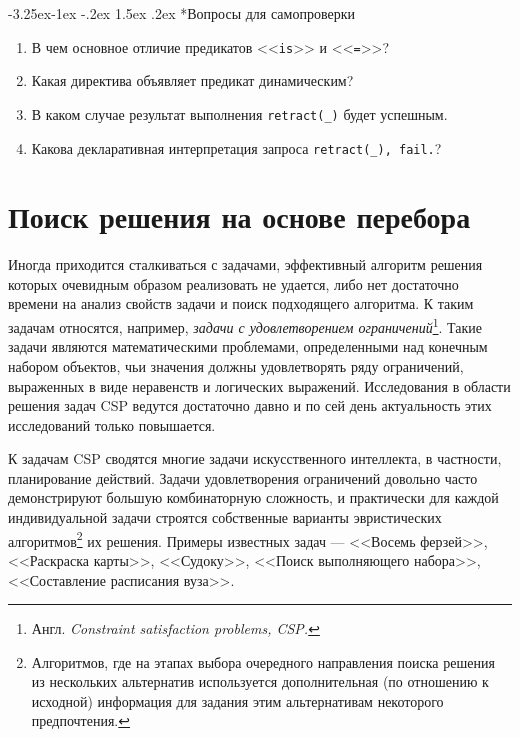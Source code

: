 \documentclass[12pt, openany, twoside]{book} %
\makeatletter
\renewcommand\subsubsection{\@startsection{subsubsection}{3}{\z@}%
                                     {-3.25ex\@plus -1ex \@minus -.2ex}%
                                     {1.5ex \@plus .2ex}%
                                     {\normalfont\normalsize\bfseries}}
\newenvironment{questions}{\subsubsection*{Вопросы для самопроверки}\begin{enumerate}}{\end{enumerate}}
\makeatother
\begin{document}
\begin{questions}
  \item{} В чем основное отличие предикатов <<\texttt{is}>> и <<\texttt{=}>>?
  \item{} Какая директива объявляет предикат динамическим?
  \item{} В каком случае результат выполнения \texttt{retract(\_)} будет ус\-пеш\-ным.
  \item{} Какова декларативная интерпретация запроса \texttt{retract(\_), fail.}?
\end{questions}

\chapter{Поиск решения на основе перебора}

Иногда приходится сталкиваться с задачами, эффективный алгоритм решения которых очевидным образом реализовать не удается, либо нет достаточно времени на анализ свойств задачи и поиск подходящего алгоритма. К таким задачам относятся, например, \emph{задачи с удовлетворением ограничений}\footnote{Англ. \emph{Constraint satisfaction problems, CSP.}}. Такие задачи являются математическими проблемами, определенными над конечным набором объектов, чьи значения должны удовлетворять ряду ограничений, выраженных в виде неравенств и логических выражений. Исследования в области решения задач CSP ведутся достаточно давно и по сей день актуальность этих исследований только повышается.

К задачам CSP сводятся многие задачи искусственного интеллекта, в частности, планирование действий. Задачи удовлетворения ограничений довольно часто демонстрируют большую комбинаторную сложность, и практически для каждой индивидуальной задачи строятся собственные варианты эвристических алгоритмов\footnote{Алгоритмов, где на этапах выбора очередного направления поиска решения из нескольких альтернатив используется дополнительная (по отношению к исходной) информация для задания этим альтернативам некоторого предпочтения.} их решения. Примеры известных задач --- <<Восемь ферзей>>, <<Раскраска карты>>, <<Судоку>>, <<Поиск выполняющего набора>>, <<Составление расписания вуза>>.
\end{document}
